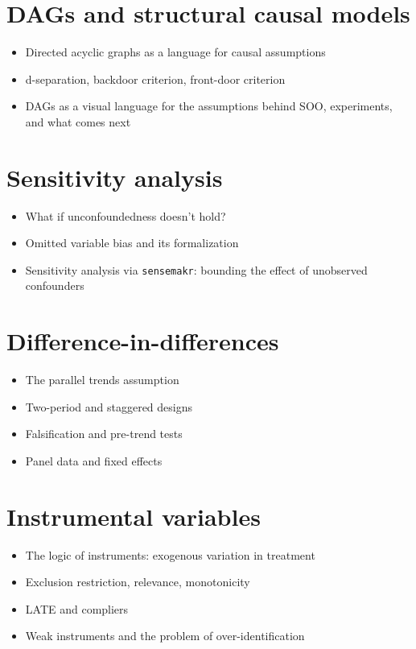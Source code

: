 \documentclass[PS]{syllabus}
\begin{document}
\begin{syllabus}
\section{DAGs and structural causal models}
\begin{itemize}
\item Directed acyclic graphs as a language for causal assumptions
\item d-separation, backdoor criterion, front-door criterion
\item DAGs as a visual language for the assumptions behind SOO, experiments, and what comes next
\end{itemize}

\section{Sensitivity analysis}
\begin{itemize}
\item What if unconfoundedness doesn't hold?
\item Omitted variable bias and its formalization
\item Sensitivity analysis via \texttt{sensemakr}: bounding the effect of unobserved confounders
\end{itemize}

\section{Difference-in-differences}
\begin{itemize}
\item The parallel trends assumption
\item Two-period and staggered designs
\item Falsification and pre-trend tests
\item Panel data and fixed effects
\end{itemize}

\section{Instrumental variables}
\begin{itemize}
\item The logic of instruments: exogenous variation in treatment
\item Exclusion restriction, relevance, monotonicity
\item LATE and compliers
\item Weak instruments and the problem of over-identification
\end{itemize}


\end{syllabus}
\end{document}
